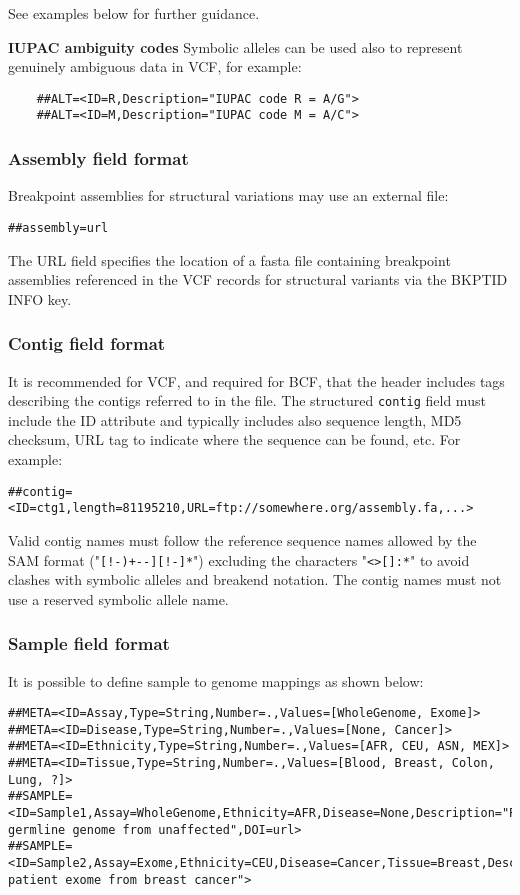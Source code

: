 \documentclass[8pt]{article}
\begin{document}
See examples below for further guidance.

\bigskip

\noindent \textbf{IUPAC ambiguity codes} \newline
Symbolic alleles can be used also to represent genuinely ambiguous data in VCF, for example:
\begin{verbatim}
    ##ALT=<ID=R,Description="IUPAC code R = A/G">
    ##ALT=<ID=M,Description="IUPAC code M = A/C">
\end{verbatim}


\subsubsection{Assembly field format}
Breakpoint assemblies for structural variations may use an external file:
\begin{verbatim}
##assembly=url
\end{verbatim}

The URL field specifies the location of a fasta file containing breakpoint assemblies referenced in the VCF records for structural variants via the BKPTID INFO key.

\subsubsection{Contig field format}
\label{sec-contig-field}
It is recommended for VCF, and required for BCF, that the header includes tags
describing the contigs referred to in the file. The structured \texttt{contig}
field must include the ID attribute and typically includes also
sequence length, MD5 checksum, URL tag to indicate where the sequence can be
found, etc. For example: 
\begin{verbatim}
##contig=<ID=ctg1,length=81195210,URL=ftp://somewhere.org/assembly.fa,...>
\end{verbatim}

\noindent
Valid contig names must follow the reference sequence names allowed by the SAM format
("{\tt [!-)+--][!-]*}") excluding the characters "\texttt{\textless\textgreater[]:*}" to avoid clashes with
symbolic alleles and breakend notation.  The contig names must not use a reserved symbolic allele name.


\subsubsection{Sample field format}
It is possible to define sample to genome mappings as shown below:
{\scriptsize
\begin{verbatim}
##META=<ID=Assay,Type=String,Number=.,Values=[WholeGenome, Exome]>
##META=<ID=Disease,Type=String,Number=.,Values=[None, Cancer]>
##META=<ID=Ethnicity,Type=String,Number=.,Values=[AFR, CEU, ASN, MEX]>
##META=<ID=Tissue,Type=String,Number=.,Values=[Blood, Breast, Colon, Lung, ?]>
##SAMPLE=<ID=Sample1,Assay=WholeGenome,Ethnicity=AFR,Disease=None,Description="Patient germline genome from unaffected",DOI=url>
##SAMPLE=<ID=Sample2,Assay=Exome,Ethnicity=CEU,Disease=Cancer,Tissue=Breast,Description="European patient exome from breast cancer">
\end{verbatim}}
\end{document}
